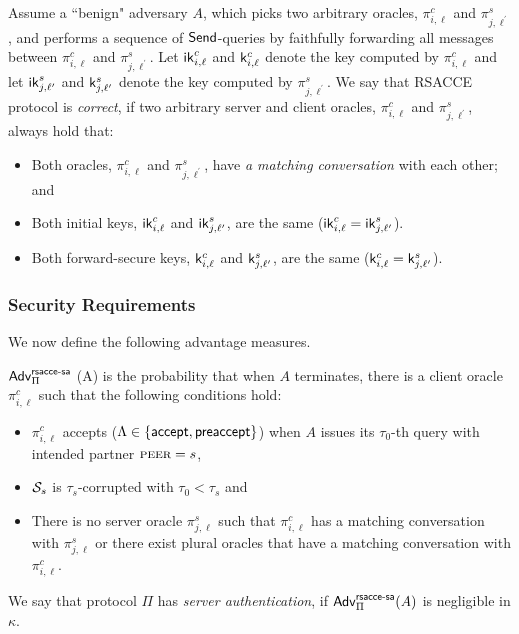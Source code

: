\begin{definition}[Correctness]
 Assume a ``benign" adversary $A$, which picks two
 arbitrary oracles, $\pi^c_{i, \ell}$ and
 $\pi^s_{j, \ell^{\prime}}$, and performs a sequence of
 $\mathsf{Send}$-queries by faithfully forwarding all messages
 between $\pi^c_{i, \ell}$ and $\pi^s_{j, \ell^{\prime}}$.
 Let $\mathsf{ik}^c_{i, \ell}$ and $\mathsf{k}^c_{i, \ell}$ denote the
 key computed by $\pi^c_{i, \ell}$ and let
 $\mathsf{ik}^s_{j, \ell^{\prime}}$ and $\mathsf{k}^s_{j, \ell^{\prime}}$
 denote the key computed by $\pi^s_{j, \ell^{\prime}}$.
 We say that RSACCE protocol is \textit{correct}, if two
 arbitrary server and client oracles, $\pi^c_{i, \ell}$
 and $\pi^s_{j, \ell^{\prime}}$, always hold that:
 \begin{itemize}
  \item{Both oracles, $\pi^c_{i, \ell}$ and
  $\pi^s_{j, \ell^{\prime}}$, have
  \textit{a matching conversation} with each other; and}

  \item{Both initial keys, $\mathsf{ik}^c_{i, \ell}$ and
  $\mathsf{ik}^s_{j, \ell^{\prime}}$, are the same
  ($\mathsf{ik}^c_{i, \ell} = \mathsf{ik}^s_{j, \ell^{\prime}}$).}

  \item{Both forward-secure keys, $\mathsf{k}^c_{i, \ell}$ and
  $\mathsf{k}^s_{j, \ell^{\prime}}$, are the same
  ($\mathsf{k}^c_{i, \ell} = \mathsf{k}^s_{j, \ell^{\prime}}$).}
 \end{itemize}
\end{definition}

\subsubsection{Security Requirements}
We now define the following advantage measures.

\begin{definition} \label{def:rsacce-sa}
 $\mathsf{Adv}^{\mathsf{rsacce\textsc{-} sa}}_{\Pi}$ (A) is the probability that when
 $A$ terminates, there is a client oracle $\pi^c_{i, \ell}$
 such that the following conditions hold:
 \begin{itemize}
  \item{$\pi^c_{i, \ell}$ accepts
  ($\Lambda \in \{\mathsf{accept}, \mathsf{preaccept}\}$) when $A$ issues its
  $\tau_0$-th query with intended partner $\textsc{peer}=s$, }

  \item{$\mathcal{S}_s$ is $\tau_{s}$-corrupted with
  $\tau_0 < \tau_{s}$ and}

  \item{There is no server oracle $\pi^s_{j, \ell}$ such
  that $\pi^c_{i,\ell}$ has a matching conversation with
  $\pi^s_{j,\ell}$ or there exist plural oracles that have
  a matching conversation with $\pi^c_{i,\ell}$.}
 \end{itemize}
 We say that protocol $\Pi$ has \textit{server authentication},
 if $\mathsf{Adv}^{\mathsf{rsacce\textsc{-} sa}}_{\Pi}(A)$ is negligible in $\kappa$.
\end{definition}

